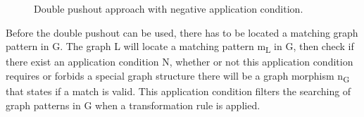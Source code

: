 \begin{figure}[H]
	\centering
	\caption[The Double Pushout approach with NAC]
	{Double pushout approach with negative application condition.}
	\label{fig:DPO_NAC}
\end{figure}

Before the double pushout can be used, there has to be located a matching graph
pattern in G. The graph L will locate a matching pattern m\textsubscript{L} in
G, then check if there exist an application condition N, whether or not this application
condition requires or forbids a special graph structure there will be a graph
morphism n\textsubscript{G} that states if a match is valid. This application
condition filters the searching of graph patterns in G when a transformation
rule is applied.




